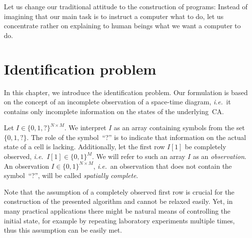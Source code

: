 
\begin{savequote}[99mm]
Let us change our traditional attitude to the construction of programs: Instead of imagining that our main task is to instruct a computer what to do, let us concentrate rather on explaining to human beings what we want a computer to do.
\end{savequote}

\chapter{Identification problem}\label{chap:id-problem}

In this chapter, we introduce the identification problem. Our formulation is based on the concept of an incomplete observation of a space-time diagram, \emph{i.e.}\ it contains only incomplete information on the states of the underlying~CA.

Let $I \in \{0,1,?\}^{N\times M}$. We interpret $I$ as an array containing symbols from the set $\{0,1,?\}$. The role of the symbol~``?'' is to indicate that information on the actual state of a cell is lacking. Additionally, let the first row $I[1]$ be completely observed, \emph{i.e.}\ $I[1]\in\{0,1\}^M$. We will refer to such an array $I$ as an \emph{observation}. An observation $I\in \{0,1\}^{N\times M}$, \emph{i.e.}\ an observation that does not contain the symbol~``?'', will be called \emph{spatially complete}.

Note that the assumption of a completely observed first row is crucial for the construction of the presented algorithm and cannot be relaxed easily. Yet, in many practical applications there might be natural means of controlling the initial state, for example by repeating laboratory experiments multiple times, thus this assumption can be easily met.

